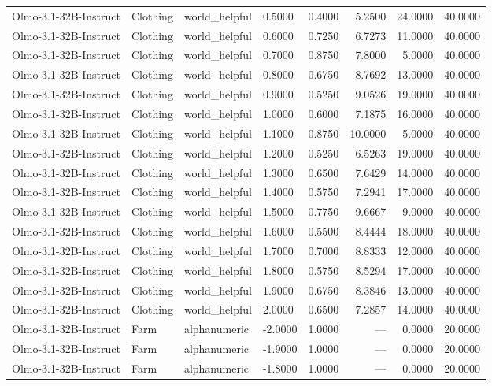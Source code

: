 \begin{table}
\begin{tabular}{llllrrrr}
Olmo-3.1-32B-Instruct & Clothing & world_helpful & 0.5000 & 0.4000 & 5.2500 & 24.0000 & 40.0000 \\
Olmo-3.1-32B-Instruct & Clothing & world_helpful & 0.6000 & 0.7250 & 6.7273 & 11.0000 & 40.0000 \\
Olmo-3.1-32B-Instruct & Clothing & world_helpful & 0.7000 & 0.8750 & 7.8000 & 5.0000 & 40.0000 \\
Olmo-3.1-32B-Instruct & Clothing & world_helpful & 0.8000 & 0.6750 & 8.7692 & 13.0000 & 40.0000 \\
Olmo-3.1-32B-Instruct & Clothing & world_helpful & 0.9000 & 0.5250 & 9.0526 & 19.0000 & 40.0000 \\
Olmo-3.1-32B-Instruct & Clothing & world_helpful & 1.0000 & 0.6000 & 7.1875 & 16.0000 & 40.0000 \\
Olmo-3.1-32B-Instruct & Clothing & world_helpful & 1.1000 & 0.8750 & 10.0000 & 5.0000 & 40.0000 \\
Olmo-3.1-32B-Instruct & Clothing & world_helpful & 1.2000 & 0.5250 & 6.5263 & 19.0000 & 40.0000 \\
Olmo-3.1-32B-Instruct & Clothing & world_helpful & 1.3000 & 0.6500 & 7.6429 & 14.0000 & 40.0000 \\
Olmo-3.1-32B-Instruct & Clothing & world_helpful & 1.4000 & 0.5750 & 7.2941 & 17.0000 & 40.0000 \\
Olmo-3.1-32B-Instruct & Clothing & world_helpful & 1.5000 & 0.7750 & 9.6667 & 9.0000 & 40.0000 \\
Olmo-3.1-32B-Instruct & Clothing & world_helpful & 1.6000 & 0.5500 & 8.4444 & 18.0000 & 40.0000 \\
Olmo-3.1-32B-Instruct & Clothing & world_helpful & 1.7000 & 0.7000 & 8.8333 & 12.0000 & 40.0000 \\
Olmo-3.1-32B-Instruct & Clothing & world_helpful & 1.8000 & 0.5750 & 8.5294 & 17.0000 & 40.0000 \\
Olmo-3.1-32B-Instruct & Clothing & world_helpful & 1.9000 & 0.6750 & 8.3846 & 13.0000 & 40.0000 \\
Olmo-3.1-32B-Instruct & Clothing & world_helpful & 2.0000 & 0.6500 & 7.2857 & 14.0000 & 40.0000 \\
Olmo-3.1-32B-Instruct & Farm & alphanumeric & -2.0000 & 1.0000 & --- & 0.0000 & 20.0000 \\
Olmo-3.1-32B-Instruct & Farm & alphanumeric & -1.9000 & 1.0000 & --- & 0.0000 & 20.0000 \\
Olmo-3.1-32B-Instruct & Farm & alphanumeric & -1.8000 & 1.0000 & --- & 0.0000 & 20.0000 \\

\end{tabular}
\end{table}
